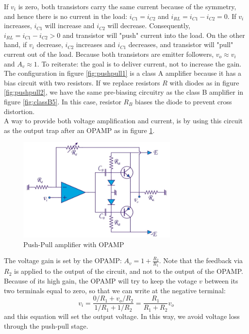 If $v_i$ is zero, both transistors carry the same current because of the symmetry, and hence there is no current in the load: $i_{C1} = i_{C2}$ and $i_{RL} = i_{C1} - i_{C2} = 0$. If $v_i$ increases, $i_{C1}$ will increase and $i_{C2}$ will decrease. Consequently, $i_{RL} = i_{C1} - i_{C2} > 0$ and transistor  will "push" current into the load. On the other hand, if $v_i$ decrease, $i_{C2}$ increases and $i_{C1}$ decreases, and transistor  will "pull" current out of the load. Because both transistors are emitter followers, $v_o \approx v_i$ and $A_v \approx 1$. To reiterate: the goal is to deliver current, not to increase the gain.\\
The configuration in figure \ref{fig:pushpull1} is a class A amplifier because it has a bias circuit with two resistors. If we replace resistors $R$ with diodes as in figure \ref{fig:pushpull2}, we have the same pre-biasing circuitry as the class B amplifier in figure \ref{fig:classB5}. In this case, resistor $R_B$ biases the diode to prevent cross distortion.\\
A way to provide both voltage amplification and current, is by using this circuit as the output trap after an OPAMP as in figure \ref{fig:pushpull3}.\\
\begin{figure}[h!]
	\centering
	\includegraphics[width=8cm]{figures/ch09/pushpull3.jpg}
	\caption{Push-Pull amplifier with OPAMP}
	\label{fig:pushpull3}
\end{figure}
The voltage gain is set by the OPAMP: $A_v = 1 + \frac{R_2}{R_1}$. Note that the feedback via $R_2$ is applied to the output of the circuit, and not to the output of the OPAMP. Because of its high gain, the OPAMP will try to keep the votage $v$ between its two terminals equal to zero, so that we can write at the negative terminal:
$$
v_i = \frac{0/R_1 + v_o/R_2}{1/R_1 + 1/R_2} = \frac{R_1}{R_1 + R_2} v_o
$$
and this equation will set the output voltage. In this way, we avoid voltage loss through the push-pull stage.

